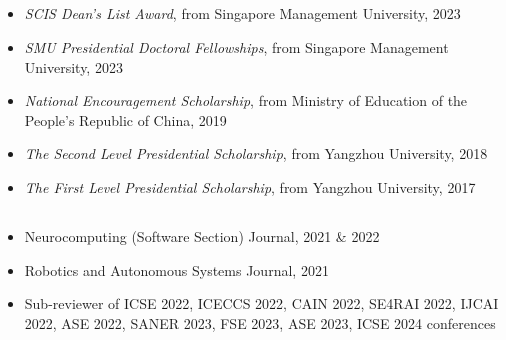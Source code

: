 \documentclass{resume}
\begin{document}
\vspace{-0.2cm}
\subsection*{\textcolor{accentcolor}{}}
  \begin{itemize}
    \item \emph{SCIS Dean's List Award}, from Singapore Management University, 2023
    \item \emph{SMU Presidential Doctoral Fellowships}, from Singapore Management University, 2023
    \item \emph{National Encouragement Scholarship}, from Ministry of Education of the People's Republic of China, 2019
    \item \emph{The Second Level Presidential Scholarship}, from Yangzhou University, 2018
    \item \emph{The First Level Presidential Scholarship}, from Yangzhou University, 2017
  \end{itemize}


\vspace{-0.2cm}
\subsection*{\textcolor{accentcolor}{}}
\begin{itemize}
  \item Neurocomputing (Software Section) Journal, 2021 \& 2022
  \item Robotics and Autonomous Systems Journal, 2021
  \item Sub-reviewer of ICSE 2022, ICECCS 2022, CAIN 2022, SE4RAI 2022, IJCAI 2022, ASE 2022, SANER 2023, FSE 2023, ASE 2023, ICSE 2024 conferences
\end{itemize}
\end{document}
